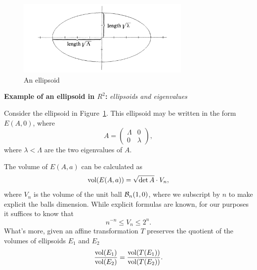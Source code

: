 \begin{figure}[t]
  \centering
  \includegraphics[width=0.75\textwidth]{img/ellipsoid}
  \caption{An ellipsoid}
  \label{fig:ellipsoid-eigenvalue}
\end{figure}
\begin{examplebox}{\textbf{Example of an ellipsoid in \(R^2\):} \textit{ellipsoids and
  eigenvalues}}
  \begin{example} Consider the ellipsoid in
    Figure~\ref{fig:ellipsoid-eigenvalue}. This ellipsoid may be written in the
    form \(E(A,0)\), where
    \[A = \left(\begin{matrix}
      \Lambda & 0\\
      0 & \lambda
    \end{matrix}\right),\]
    where \(\lambda < \Lambda\) are the two eigenvalues of \(A\).
  \end{example}
\end{examplebox}

\begin{fact}
  The volume of \(E(A,a)\) can be calculated as
  \[\textnormal{vol}(E(A, a)) = \sqrt{\det A} \cdot V_n,\]
  where \(V_n\) is the volume of the unit ball \(\mathcal{B}_n(1,0)\), where we
  subscript by \(n\) to make explicit the balls dimension. While explicit
  formulas are known, for our purposes it suffices to know that
  \[n^{-n} \leq V_n \leq 2^n.\]
  What's more, given an affine transformation \(T\) preserves the quotient of
  the volumes of ellipsoids \(E_1\) and \(E_2\)
  \[\frac{\textnormal{vol}(E_1)}{\textnormal{vol}(E_2)} = \frac{\textnormal{vol}(T(E_1))}{\textnormal{vol}(T(E_2))}.\]
\end{fact}

